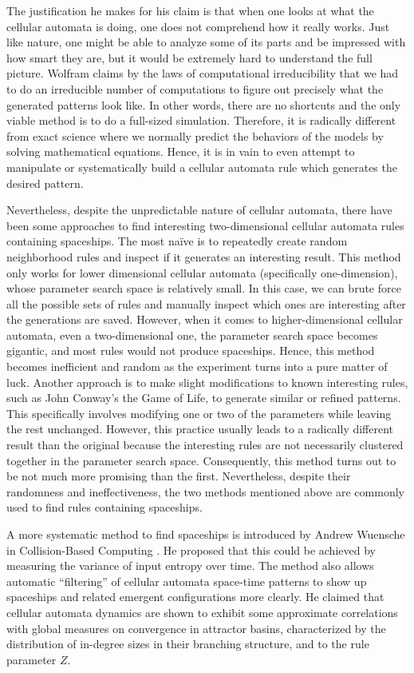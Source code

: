 \documentclass[12pt]{article}
\numberwithin{figure}{section} %
\begin{document}
The justification he makes for his claim is that when one looks at what the cellular automata is doing, one does not comprehend how it really works. Just like nature, one might be able to analyze some of its parts and be impressed with how smart they are, but it would be extremely hard to understand the full picture. Wolfram claims by the laws of computational irreducibility that we had to do an irreducible number of computations to figure out precisely what the generated patterns look like. In other words, there are no shortcuts and the only viable method is to do a full-sized simulation. Therefore, it is radically different from exact science where we normally predict the behaviors of the models by solving mathematical equations. Hence, it is in vain to even attempt to manipulate or systematically build a cellular automata rule which generates the desired pattern. 

Nevertheless, despite the unpredictable nature of cellular automata, there have been some approaches to find interesting two-dimensional cellular automata rules containing spaceships. The most naïve is to repeatedly create random neighborhood rules and inspect if it generates an interesting result. This method only works for lower dimensional cellular automata (specifically one-dimension), whose parameter search space is relatively small. In this case, we can brute force all the possible sets of rules and manually inspect which ones are interesting after the generations are saved. However, when it comes to higher-dimensional cellular automata, even a two-dimensional one, the parameter search space becomes gigantic, and most rules would not produce spaceships. Hence, this method becomes inefficient and random as the experiment turns into a pure matter of luck. Another approach is to make slight modifications to known interesting rules, such as John Conway’s the Game of Life, to generate similar or refined patterns. This specifically involves modifying one or two of the parameters while leaving the rest unchanged. However, this practice usually leads to a radically different result than the original because the interesting rules are not necessarily clustered together in the parameter search space. Consequently, this method turns out to be not much more promising than the first. Nevertheless, despite their randomness and ineffectiveness, the two methods mentioned above are commonly used to find rules containing spaceships. 

A more systematic method to find spaceships is introduced by Andrew Wuensche in Collision-Based Computing \cite{Finding Gliders in Cellular Automata}. He proposed that this could be achieved by measuring the variance of input entropy over time. The method also allows automatic “filtering” of cellular automata space-time patterns to show up spaceships and related emergent configurations more clearly. He claimed that cellular automata dynamics are shown to exhibit some approximate correlations with global measures on convergence in attractor basins, characterized by the distribution of in-degree sizes in their branching structure, and to the rule parameter $Z$. 
\end{document}
